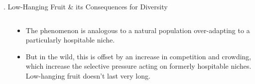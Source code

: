\documentclass[9pt]{beamer}
\newcommand{\BackgroundImage}[2][0.3] {
  \tikz[remember picture,overlay]
  \node[opacity=#1+0.1, inner sep=0pt] at (current page.center)
       {\texttt{[image: \#2]}};
       \clearpage
}
\begin{document}
\begin{frame}{\theframenumber. Low-Hanging Fruit \& its Consequences for Diversity}
\begin{columns}
\begin{column}{.5\textwidth}
\begin{itemize}
      \end{itemize}
    \end{column}
    \begin{column}{.5\textwidth}
      \begin{itemize}
      \item The phenomenon is analogous to a natural population
        over-adapting to a particularly hospitable niche.
      \item But in the wild, this is
        offset by an increase in competition and crowding,
        which increase the selective pressure acting on formerly
        hospitable niches. Low-hanging fruit doesn't last very long.
      \end{itemize}
    \end{column}
    \end{columns}
\end{frame}



\end{document}
